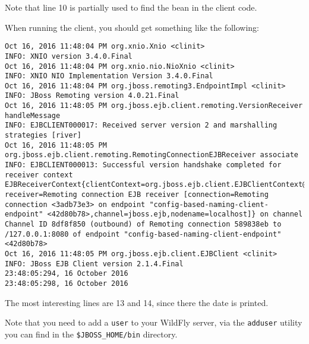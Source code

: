 \documentclass{report}
\begin{document}
Note that line 10 is partially used to find the bean in the client code. 

When running the client, you should get something like the following:
\begin{lstlisting}[language=ksh]
Oct 16, 2016 11:48:04 PM org.xnio.Xnio <clinit>
INFO: XNIO version 3.4.0.Final
Oct 16, 2016 11:48:04 PM org.xnio.nio.NioXnio <clinit>
INFO: XNIO NIO Implementation Version 3.4.0.Final
Oct 16, 2016 11:48:04 PM org.jboss.remoting3.EndpointImpl <clinit>
INFO: JBoss Remoting version 4.0.21.Final
Oct 16, 2016 11:48:05 PM org.jboss.ejb.client.remoting.VersionReceiver handleMessage
INFO: EJBCLIENT000017: Received server version 2 and marshalling strategies [river]
Oct 16, 2016 11:48:05 PM org.jboss.ejb.client.remoting.RemotingConnectionEJBReceiver associate
INFO: EJBCLIENT000013: Successful version handshake completed for receiver context EJBReceiverContext{clientContext=org.jboss.ejb.client.EJBClientContext@1e88b3c, receiver=Remoting connection EJB receiver [connection=Remoting connection <3adb73e3> on endpoint "config-based-naming-client-endpoint" <42d80b78>,channel=jboss.ejb,nodename=localhost]} on channel Channel ID 8df8f850 (outbound) of Remoting connection 589838eb to /127.0.0.1:8080 of endpoint "config-based-naming-client-endpoint" <42d80b78>
Oct 16, 2016 11:48:05 PM org.jboss.ejb.client.EJBClient <clinit>
INFO: JBoss EJB Client version 2.1.4.Final
23:48:05:294, 16 October 2016
23:48:05:298, 16 October 2016
\end{lstlisting}
The most interesting lines are 13 and 14, since there the date is printed.

Note that you need to add a \texttt{user} to your WildFly server, via the \texttt{adduser} utility you can find in the \texttt{\$JBOSS\_HOME/bin} directory.
\end{document}

